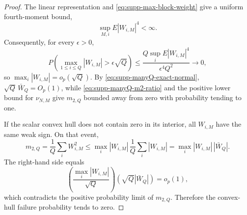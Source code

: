 \documentclass[12pt]{article}
\theoremstyle{remark}
\begin{document}
\begin{proof}
The linear representation and \eqref{eq:supp-max-block-weight} give a uniform fourth-moment bound,
\[
\sup_{M,i}E|W_{i,M}|^4<\infty.
\]
Consequently, for every $\epsilon>0$,
\[
P\left(\max_{1\le i\le Q}|W_{i,M}|>\epsilon\sqrt Q\right)
\le
\frac{Q\sup_iE|W_{i,M}|^4}{\epsilon^4Q^2}
\longrightarrow0,
\]
so $\max_i|W_{i,M}|=o_p(\sqrt Q)$. By \eqref{eq:supp-manyQ-exact-normal}, $\sqrt Q\,\bar W_Q=O_p(1)$, while \eqref{eq:supp-manyQ-m2-ratio} and the positive lower bound for $\nu_{N,M}$ give $m_{2,Q}$ bounded away from zero with probability tending to one.

If the scalar convex hull does not contain zero in its interior, all $W_{i,M}$ have the same weak sign. On that event,
\[
m_{2,Q}
=\frac1Q\sum_iW_{i,M}^2
\le
\max_i|W_{i,M}|\,\frac1Q\sum_i|W_{i,M}|
=\max_i|W_{i,M}|\,|\bar W_Q|.
\]
The right-hand side equals
\[
\left(\frac{\max_i|W_{i,M}|}{\sqrt Q}\right)
\left(\sqrt Q|\bar W_Q|\right)=o_p(1),
\]
which contradicts the positive probability limit of $m_{2,Q}$. Therefore the convex-hull failure probability tends to zero.
\end{proof}
\end{document}
